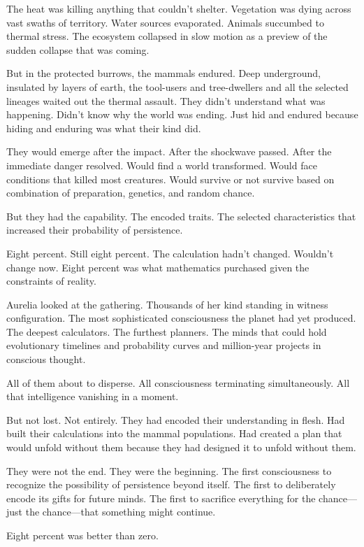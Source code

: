 The heat was killing anything that couldn't shelter. Vegetation was dying across vast swaths of territory. Water sources evaporated. Animals succumbed to thermal stress. The ecosystem collapsed in slow motion as a preview of the sudden collapse that was coming.

But in the protected burrows, the mammals endured. Deep underground, insulated by layers of earth, the tool-users and tree-dwellers and all the selected lineages waited out the thermal assault. They didn't understand what was happening. Didn't know why the world was ending. Just hid and endured because hiding and enduring was what their kind did.

They would emerge after the impact. After the shockwave passed. After the immediate danger resolved. Would find a world transformed. Would face conditions that killed most creatures. Would survive or not survive based on combination of preparation, genetics, and random chance.

But they had the capability. The encoded traits. The selected characteristics that increased their probability of persistence.

Eight percent. Still eight percent. The calculation hadn't changed. Wouldn't change now. Eight percent was what mathematics purchased given the constraints of reality.

Aurelia looked at the gathering. Thousands of her kind standing in witness configuration. The most sophisticated consciousness the planet had yet produced. The deepest calculators. The furthest planners. The minds that could hold evolutionary timelines and probability curves and million-year projects in conscious thought.

All of them about to disperse. All consciousness terminating simultaneously. All that intelligence vanishing in a moment.

But not lost. Not entirely. They had encoded their understanding in flesh. Had built their calculations into the mammal populations. Had created a plan that would unfold without them because they had designed it to unfold without them.

They were not the end. They were the beginning. The first consciousness to recognize the possibility of persistence beyond itself. The first to deliberately encode its gifts for future minds. The first to sacrifice everything for the chance—just the chance—that something might continue.

Eight percent was better than zero.

